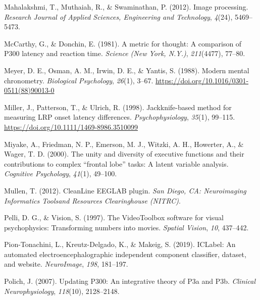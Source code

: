 \documentclass[
  man]{apa7}
\newlength{\cslhangindent}
\newlength{\cslentryspacingunit} %
\newenvironment{CSLReferences}[2] %
 {%
  \setlength{\parindent}{0pt}
  \ifodd #1
  \let\oldpar\par
  \def\par{\hangindent=\cslhangindent\oldpar}
  \fi
  \setlength{\parskip}{#2\cslentryspacingunit}
 }%
 {}
\begin{document}
\begin{CSLReferences}{1}{0}
\leavevmode{}%
Mahalakshmi, T., Muthaiah, R., \& Swaminathan, P. (2012). Image processing. \emph{Research Journal of Applied Sciences, Engineering and Technology}, \emph{4}(24), 5469--5473.

\leavevmode{}%
McCarthy, G., \& Donchin, E. (1981). A metric for thought: A comparison of {P300} latency and reaction time. \emph{Science (New York, N.Y.)}, \emph{211}(4477), 77--80.

\leavevmode{}%
Meyer, D. E., Osman, A. M., Irwin, D. E., \& Yantis, S. (1988). Modern mental chronometry. \emph{Biological Psychology}, \emph{26}(1), 3--67. \url{https://doi.org/10.1016/0301-0511(88)90013-0}

\leavevmode{}%
Miller, J., Patterson, T., \& Ulrich, R. (1998). Jackknife-based method for measuring {LRP} onset latency differences. \emph{Psychophysiology}, \emph{35}(1), 99--115. \url{https://doi.org/10.1111/1469-8986.3510099}

\leavevmode{}%
Miyake, A., Friedman, N. P., Emerson, M. J., Witzki, A. H., Howerter, A., \& Wager, T. D. (2000). The unity and diversity of executive functions and their contributions to complex {``frontal lobe''} tasks: {A} latent variable analysis. \emph{Cognitive Psychology}, \emph{41}(1), 49--100.

\leavevmode{}%
Mullen, T. (2012). {CleanLine} {EEGLAB} plugin. \emph{San Diego, CA: Neuroimaging Informatics Toolsand Resources Clearinghouse (NITRC)}.

\leavevmode{}%
Pelli, D. G., \& Vision, S. (1997). The {VideoToolbox} software for visual psychophysics: {Transforming} numbers into movies. \emph{Spatial Vision}, \emph{10}, 437--442.

\leavevmode{}%
Pion-Tonachini, L., Kreutz-Delgado, K., \& Makeig, S. (2019). {ICLabel}: {An} automated electroencephalographic independent component classifier, dataset, and website. \emph{NeuroImage}, \emph{198}, 181--197.

\leavevmode{}%
Polich, J. (2007). Updating {P300}: An integrative theory of {P3a} and {P3b}. \emph{Clinical Neurophysiology}, \emph{118}(10), 2128--2148.


\end{CSLReferences}
\end{document}
